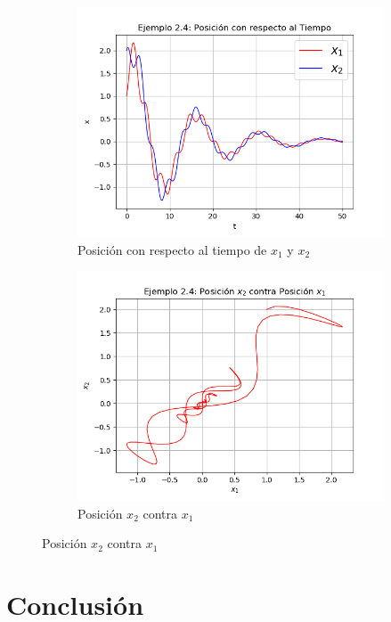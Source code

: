 \documentclass[a4paper]{article}
\begin{document}
\begin{center}
\begin{figure}[ht!]
\begin{subfigure}{0.6\textwidth}
  \includegraphics[width=\linewidth]{ejemplo_2_4_1.png}
  \caption{Posición con respecto al tiempo de $x_1$ y $x_2$}
\end{subfigure}
\begin{subfigure}{0.6\textwidth}
  \centering
  \includegraphics[width=\linewidth]{ejemplo_2_4_4.png}
  \caption{Posición $x_2$ contra $x_1$}
\end{subfigure}
\end{figure}

\section{Conclusión}


\end{center}
\end{document}
